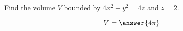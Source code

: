 \documentclass{ximera}
\author{David Guichard \and Neal Koblitz \and H. Jerome Keisler \and Albert Scheller \and Barry Balof \and Mike Wills \and Matthew Carr}
\begin{document}
\begin{exercise}




Find the volume $V$ bounded by $4x^2+y^2=4z$ and $z=2$.
\begin{prompt}
\[
V=\answer{4\pi}
\]
\end{prompt}



\end{exercise}
\end{document}
